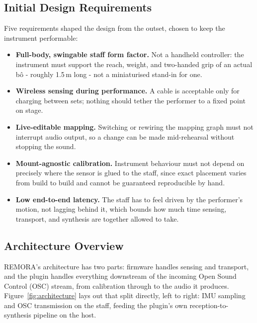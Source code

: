 \documentclass[sigconf,nonacm]{acmart}
\begin{document}
\subsection{Initial Design Requirements}
Five requirements shaped the design from the outset, chosen to keep the instrument performable:
\begin{itemize}
    \item \textbf{Full-body, swingable staff form factor.} Not a handheld controller: the instrument
must support the reach, weight, and two-handed grip of an actual b\^o - roughly 1.5\,m long - not a
miniaturised stand-in for one.
    \item \textbf{Wireless sensing during performance.} A cable is acceptable only for charging
between sets; nothing should tether the performer to a fixed point on stage.
    \item \textbf{Live-editable mapping.} Switching or rewiring the mapping graph must not interrupt
audio output, so a change can be made mid-rehearsal without stopping the sound.
    \item \textbf{Mount-agnostic calibration.} Instrument behaviour must not depend on precisely
where the sensor is glued to the staff, since exact placement varies from build to build and cannot
be guaranteed reproducible by hand.
    \item \textbf{Low end-to-end latency.} The staff has to feel driven by the performer's motion,
not lagging behind it, which bounds how much time sensing, transport, and synthesis are together
allowed to take.
\end{itemize}

\subsection{Architecture Overview}
REMORA's architecture has two parts: firmware handles sensing and transport,
and the plugin handles everything downstream of the incoming Open
Sound Control (OSC) stream, from calibration through to the audio it produces.
Figure~\ref{fig:architecture} lays out that split directly,
left to right: IMU sampling and OSC transmission on the staff, feeding the plugin's own
reception-to-synthesis pipeline on the host.
\end{document}
